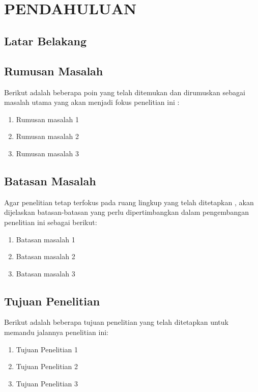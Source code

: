 \chapter[PENDAHULUAN]{\\ PENDAHULUAN}

\section{Latar Belakang}

\lipsum[1]

\section{Rumusan Masalah}
Berikut adalah beberapa poin yang telah ditemukan dan dirumuskan sebagai masalah utama yang akan menjadi fokus penelitian ini \cite{chan2013review}:
\begin{enumerate}
    \item Rumusan masalah 1
    \item Rumusan masalah 2
    \item Rumusan masalah 3	
\end{enumerate}

\section{Batasan Masalah}
Agar penelitian tetap terfokus pada ruang lingkup yang telah ditetapkan \cite{muhammadred}, akan dijelaskan batasan-batasan yang perlu dipertimbangkan dalam pengembangan penelitian ini sebagai berikut:
\begin{enumerate}
    \item Batasan masalah 1
    \item Batasan masalah 2
    \item Batasan masalah 3
\end{enumerate}

\section{Tujuan Penelitian}
Berikut adalah beberapa tujuan penelitian yang telah ditetapkan untuk memandu jalannya penelitian ini: 
\begin{enumerate}
    \item Tujuan Penelitian 1
    \item Tujuan Penelitian 2
    \item Tujuan Penelitian 3
\end{enumerate}

